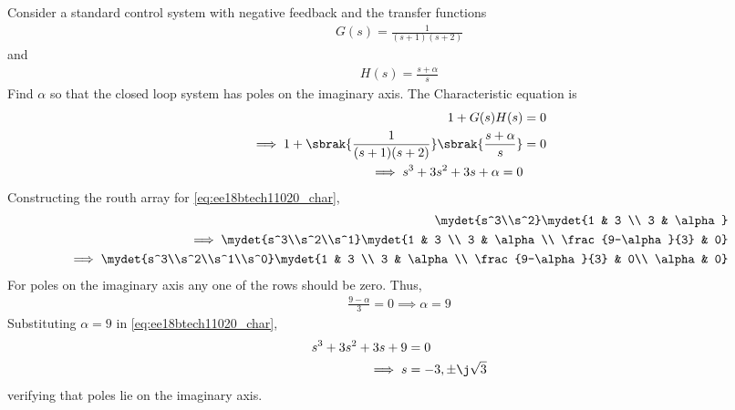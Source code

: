 
\item Consider a standard control system with negative feedback and the transfer functions 
\begin{align}
G(s) = \frac{1}{(s+1)(s+2)}
\end{align}
and
\begin{align}
H(s) = \frac{s+\alpha}{s}
\end{align}
%
Find  $\alpha$ so that 
the closed loop system has poles on the imaginary axis.
\solution The 
Characteristic equation is
\begin{align}
 1 + G(s)H(s) &= 0
\\
\implies 1 + \sbrak{\frac{1}{(s+1)(s+2)}}\sbrak{\frac{s+\alpha}{s}} &= 0
\\
\implies s^3+3s^2+3s+\alpha = 0
\label{eq:ee18btech11020_char}
\end{align}
Constructing the routh array for \eqref{eq:ee18btech11020_char},
%
\begin{align}
\mydet{s^3\\s^2}
\mydet{1 & 3 \\ 3 & \alpha }
\label{eq:sec_order_op_1}
\\
\implies \mydet{s^3\\s^2\\s^1}
\mydet{1 & 3 \\ 3 & \alpha \\  \frac{9-\alpha}{3} & 0} \label{eq:sec_order_op_1}
\\
\implies \mydet{s^3\\s^2\\s^1\\s^0}
\mydet{1 & 3 \\ 3 & \alpha \\  \frac{9-\alpha}{3} & 0\\ \alpha & 0} \label{eq:sec_order_op_1}
\end{align}
For poles on the imaginary axis any one of the rows should be zero.  Thus,
\begin{align}
\frac{9-\alpha}{3} = 0
\implies   \alpha = 9
\end{align}
Substituting $\alpha = 9$ in \eqref{eq:ee18btech11020_char},
\begin{align}
s^3+3s^2+3s+9&=0
\\
\implies s &= -3,\pm\j\sqrt{3}
\end{align}
%
verifying that poles lie on the imaginary axis.
